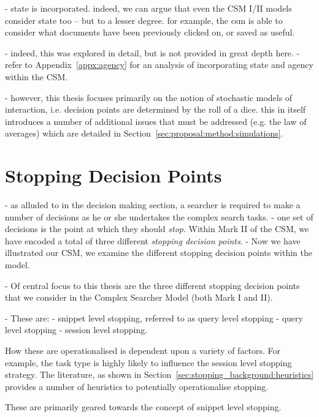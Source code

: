 - state is incorporated. indeed, we can argue that even the CSM I/II models consider state too -- but to a lesser degree. for example, the csm is able to consider what documents have been previously clicked on, or saved as useful.

- indeed, this was explored in detail, but is not provided in great depth here.
- refer to Appendix~\ref{appx:agency} for an analysis of incorporating state and agency within the CSM.

- however, this thesis focuses primarily on the notion of stochastic models of interaction, i.e. decision points are determined by the roll of a dice. this in itself introduces a number of additional issues that must be addressed (e.g. the law of averages) which are detailed in Section~\ref{sec:proposal:method:simulations}.

\section{Stopping Decision Points}\label{sec:proposal:stopping_points}
- as alluded to in the decision making section, a searcher is required to make a number of decisions as he or she undertakes the complex search tasks.
- one set of decisions is the point at which they should \emph{stop}. Within Mark II of the CSM, we have encoded a total of three different \emph{stopping decision points}.
- Now we have illustrated our CSM, we examine the different stopping decision points within the model.

- Of central focus to this thesis are the three different stopping decision points that we consider in the Complex Searcher Model (both Mark I and II).

- These are:
    - snippet level stopping, referred to as query level stopping
    - query level stopping
    - session level stopping.

How these are operationalised is dependent upon a variety of factors. For example, the task type is highly likely to influence the session level stopping strategy. The literature, as shown in Section~\ref{sec:stopping_background:heuristics} provides a number of heuristics to potentially operationalise stopping.

These are primarily geared towards the concept of snippet level stopping.

